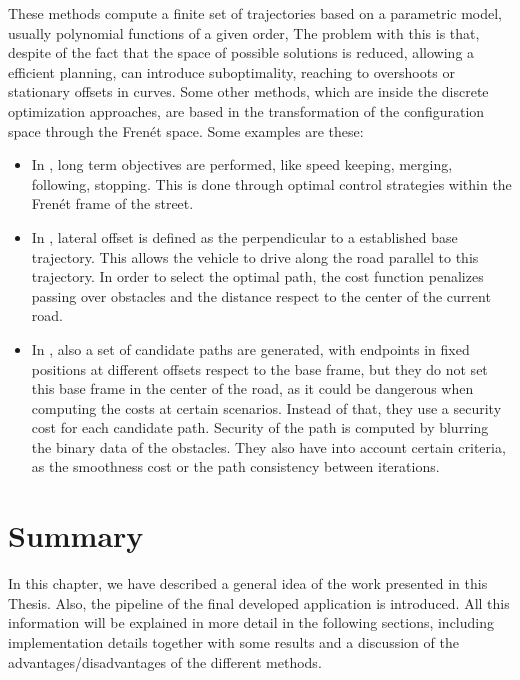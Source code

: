 These methods compute a finite set of trajectories based on a parametric model, usually polynomial functions of a given order, The problem with this is that, despite of the fact that the space of possible solutions is reduced, allowing a efficient planning, can introduce suboptimality, reaching to overshoots or stationary offsets in curves.
Some other methods, which are inside the discrete optimization approaches, are based in the transformation of the configuration space through the Fren\'et space. Some examples are these:
\begin{itemize}
 \item In \cite{werling2010optimal}, long term objectives are performed, like speed keeping, merging, following, stopping. This is done through optimal control strategies within the Fren\'et frame of the street.
 \item In \cite{thrun2006stanley}, lateral offset is defined as the perpendicular to a established base trajectory. This allows the vehicle to drive along the road parallel to this trajectory. In order to select the optimal path, the cost function penalizes passing over obstacles and the distance respect to the center of the current road.
 \item In \cite{chu2012local}, also a set of candidate paths are generated, with endpoints in fixed positions at different offsets respect to the base frame, but they do not set this base frame in the center of the road, as it could be dangerous when computing the costs at certain scenarios. Instead of that, they use a security cost for each candidate path. Security of the path is computed by blurring the binary data of the obstacles. They also have into account certain criteria, as the smoothness cost or the path consistency between iterations.
\end{itemize}

\section{Summary}\label{ch:chapter00_03}

In this chapter, we have described a general idea of the work presented in this Thesis. Also, the pipeline of the final developed application is introduced. All this information will be explained in more detail in the following sections, including implementation details together with some results and a discussion of the advantages/disadvantages of the different methods.

